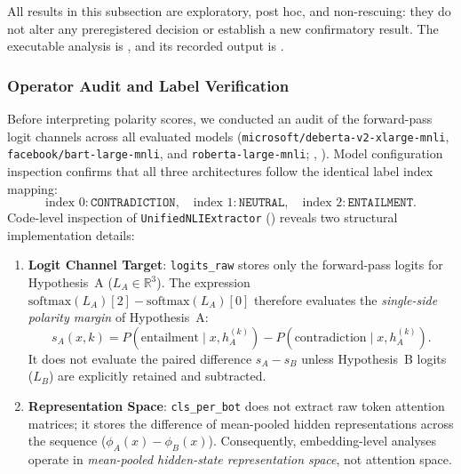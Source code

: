 All results in this subsection are exploratory, post hoc, and non-rescuing: they do not alter
any preregistered decision or establish a new confirmatory result. The executable analysis is
, and its recorded output is
.

\subsubsection{Operator Audit and Label Verification}
\label{sec:operator_audit}

Before interpreting polarity scores, we conducted an audit of the forward-pass logit channels across all evaluated models (\texttt{microsoft/deberta-v2-xlarge-mnli}, \texttt{facebook/bart-large-mnli}, and \texttt{roberta-large-mnli}; , ). Model configuration inspection confirms that all three architectures follow the identical label index mapping:
\begin{equation}
    \text{index } 0: \texttt{CONTRADICTION}, \quad \text{index } 1: \texttt{NEUTRAL}, \quad \text{index } 2: \texttt{ENTAILMENT}.
\end{equation}
Code-level inspection of \texttt{UnifiedNLIExtractor} () reveals two structural implementation details:
\begin{enumerate}
    \item \textbf{Logit Channel Target}: \texttt{logits\_raw} stores only the forward-pass logits for Hypothesis~A ($L_A \in \mathbb{R}^3$). The expression $\mathrm{softmax}(L_A)[2] - \mathrm{softmax}(L_A)[0]$ therefore evaluates the \emph{single-side polarity margin} of Hypothesis~A:
    \begin{equation}
        s_A(x, k) = P(\text{entailment} \mid x, h_A^{(k)}) - P(\text{contradiction} \mid x, h_A^{(k)}).
    \end{equation}
    It does not evaluate the paired difference $s_A - s_B$ unless Hypothesis~B logits ($L_B$) are explicitly retained and subtracted.
    \item \textbf{Representation Space}: \texttt{cls\_per\_bot} does not extract raw token attention matrices; it stores the difference of mean-pooled hidden representations across the sequence ($\phi_A(x) - \phi_B(x)$). Consequently, embedding-level analyses operate in \emph{mean-pooled hidden-state representation space}, not attention space.
\end{enumerate}

